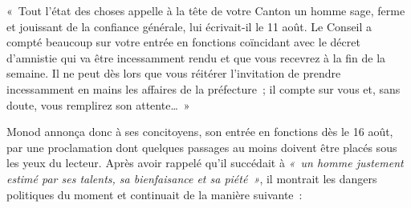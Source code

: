 \documentclass[french,twoside]{book} %
\newenvironment{quoteblock}%
  {\begin{quoting}}
  {\end{quoting}}
\newenvironment{quotebar}{%
    \def\FrameCommand{{\color{rubric!10!}\vrule width 0.5em} \hspace{0.9em}}%
    \def\OuterFrameSep{\itemsep} %
    \MakeFramed {\advance\hsize-\width \FrameRestore}
  }%
  {%
    \endMakeFramed
  }
\renewenvironment{quoteblock}%
  {%
    \savenotes
    \setstretch{0.9}
    \normalfont
    \begin{quotebar}
  }
  {%
    \end{quotebar}
    \spewnotes
  }
\begin{document}
\begin{quoteblock}
 \noindent  « Tout l’état des choses appelle à la tête de votre Canton un homme sage, ferme et jouissant de la confiance générale, lui écrivait-il le 11 août. Le Conseil a compté beaucoup sur votre entrée en fonctions coïncidant avec le décret d’amnistie qui va être incessamment rendu et que vous recevrez à la fin de la semaine. Il ne peut dès lors que vous réitérer l’invitation de prendre incessamment en mains les affaires de la préfecture ; il compte sur vous et, sans doute, vous remplirez son attente… »
 \end{quoteblock}

\noindent Monod annonça donc à ses concitoyens, son entrée en fonctions dès le 16 août, par une proclamation dont quelques passages au moins doivent être placés sous les yeux du lecteur. Après avoir rappelé qu’il succédait à \emph{« un homme justement estimé par ses talents, sa bienfaisance et sa piété »}, il montrait les dangers politiques du moment et continuait de la manière suivante :\par
\end{document}
